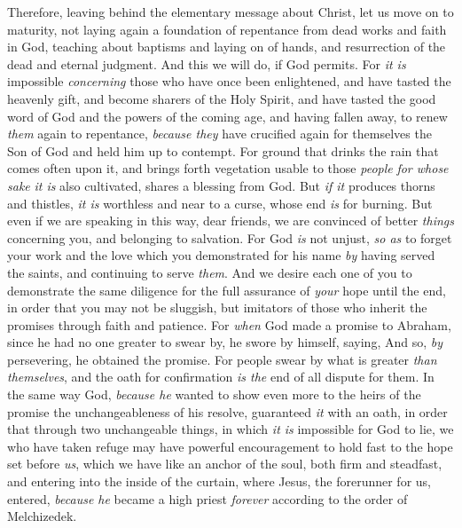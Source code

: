 \begin{biblechapter} %
 Therefore, leaving behind the elementary message about Christ, let us move on to maturity, not laying again a foundation of repentance from dead works and faith in God,
\verse teaching about baptisms and laying on of hands, and resurrection of the dead and eternal judgment.
\verse And this we will do, if God permits.
\verse For \textit{it is} impossible \textit{concerning} those who have once been enlightened, and have tasted the heavenly gift, and become sharers of the Holy Spirit,
\verse and have tasted the good word of God and the powers of the coming age,
\verse and having fallen away, to renew \textit{them} again to repentance, \textit{because they} have crucified again for themselves the Son of God and held him up to contempt.
\verse For ground that drinks the rain that comes often upon it, and brings forth vegetation usable to those \textit{people} \textit{for whose sake} \textit{it is} also cultivated, shares a blessing from God.
\verse But \textit{if it} produces thorns and thistles, \textit{it is} worthless and near to a curse, whose end \textit{is} for burning.
\verse But even if we are speaking in this way, dear friends, we are convinced of better \textit{things} concerning you, and belonging to salvation.
\verse For God \textit{is} not unjust, \textit{so as} to forget your work and the love which you demonstrated for his name \textit{by} having served the saints, and continuing to serve \textit{them}.
\verse And we desire each one of you to demonstrate the same diligence for the full assurance of \textit{your} hope until the end,
\verse in order that you may not be sluggish, but imitators of those who inherit the promises through faith and patience.
 For \textit{when} God made a promise to Abraham, since he had no one greater to swear by, he swore by himself,
\verse saying,
\verse And so, \textit{by} persevering, he obtained the promise.
\verse For people swear by what is greater \textit{than themselves}, and the oath for confirmation \textit{is the} end of all dispute for them.
\verse In the same way God, \textit{because he} wanted to show even more to the heirs of the promise the unchangeableness of his resolve, guaranteed \textit{it} with an oath,
\verse in order that through two unchangeable things, in which \textit{it is} impossible for God to lie, we who have taken refuge may have powerful encouragement to hold fast to the hope set before \textit{us},
\verse which we have like an anchor of the soul, both firm and steadfast, and entering into the inside of the curtain,
\verse where Jesus, the forerunner for us, entered, \textit{because he} became a high priest \textit{forever} according to the order of Melchizedek.
\end{biblechapter}

